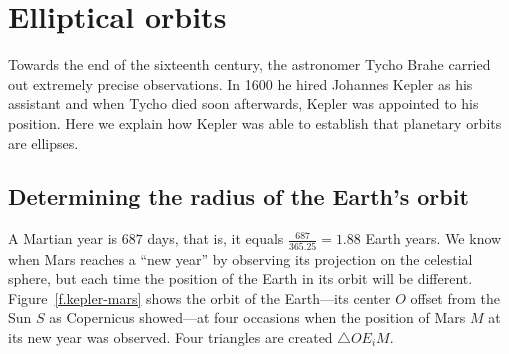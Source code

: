 

\section{Elliptical orbits}\label{s.kepler}

Towards the end of the sixteenth century, the astronomer Tycho Brahe carried out extremely precise observations. In 1600 he hired Johannes Kepler as his assistant and when Tycho died soon afterwards, Kepler was appointed to his position. Here we explain how Kepler was able to establish that planetary orbits are ellipses.

\subsection{Determining the radius of the Earth's orbit}

A Martian year is $687$ days, that is, it equals $\frac{687}{365.25} = 1.88$ Earth years. We know when Mars reaches a ``new year'' by observing its projection on the celestial sphere, but each time the position of the Earth in its orbit will be different. Figure~\ref{f.kepler-mars} shows the orbit of the Earth---its center $O$ offset from the Sun $S$ as Copernicus showed---at four occasions when the position of Mars $M$ at its new year was observed. Four triangles are created $\triangle OE_iM$.


